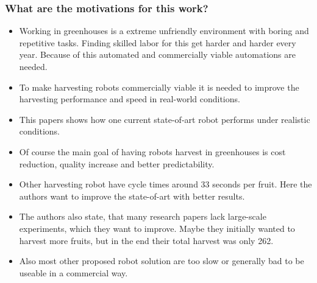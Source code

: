     
     
    \subsubsection*{What are the motivations for this work?}
    \begin{itemize}
        \item Working in greenhouses is a extreme unfriendly environment with boring and repetitive tasks. Finding skilled
        labor for this get harder and harder every year. Because of this automated and commercially viable automations are needed.
        \item To make harvesting robots commercially viable it is needed to improve the harvesting performance and speed in real-world conditions.
        \item This papers shows how one current state-of-art robot performs under realistic conditions.
        \item Of course the main goal of having robots harvest in greenhouses is cost reduction, quality increase and 
        better predictability.
        \item Other harvesting robot have cycle times around 33 seconds per fruit. Here the authors want to improve the state-of-art with better results.
        \item The authors also state, that many research papers lack large-scale experiments, which they want to improve. 
        Maybe they initially wanted to harvest more fruits, but in the end their total harvest was only 262.
        \item Also most other proposed robot solution are too slow or generally bad to be useable in a commercial way.
    \end{itemize}
